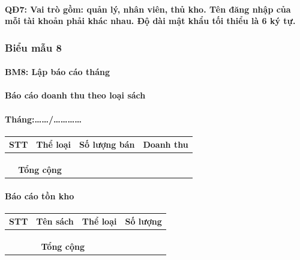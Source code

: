 \documentclass[12pt]{report}
\begin{document}
                \paragraph{QĐ7: Vai trò gồm: quản lý, nhân viên, thủ kho. Tên đăng nhập của mỗi tài khoản phải khác nhau. Độ dài mật khẩu tối thiểu là 6 ký tự.}
            \subsubsection{Biểu mẫu 8}
                \paragraph{BM8: Lập báo cáo tháng}
                \paragraph{Báo cáo doanh thu theo loại sách}
                \paragraph{Tháng:\dots\dots/\dots\dots\dots\dots}
                \begin{tabular}{|c|c|c|c|}
                    \hline
                    \textbf{STT} & \textbf{Thể loại} & \textbf{Số lượng bán} & \textbf{Doanh thu} \\ \hline
                     & & & \\ \hline
                     & & & \\ \hline
                     & & & \\ \hline
                    \multicolumn{2}{|c|}{\textbf{Tổng cộng}} & & \\ \hline
                \end{tabular}
                \paragraph{Báo cáo tồn kho}
                \begin{tabular}{|c|c|c|c|}
                    \hline
                    \textbf{STT} & \textbf{Tên sách} & \textbf{Thể loại} & \textbf{Số lượng} \\ \hline
                     & & & \\ \hline
                     & & & \\ \hline
                     & & & \\ \hline
                    \multicolumn{3}{|c|}{\textbf{Tổng cộng}} & \\ \hline
                \end{tabular}
\end{document}
